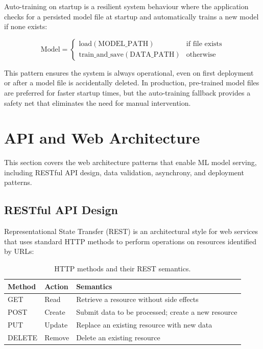 \documentclass[10pt,a4paper]{article}
\begin{document}
Auto-training on startup is a resilient system behaviour where the application checks for a persisted model file at startup and automatically trains a new model if none exists:

\begin{equation}
\text{Model} = \begin{cases} \text{load}(\text{MODEL\_PATH}) & \text{if file exists} \\ \text{train\_and\_save}(\text{DATA\_PATH}) & \text{otherwise} \end{cases}
\label{eq:auto-training}
\end{equation}

This pattern ensures the system is always operational, even on first deployment or after a model file is accidentally deleted. In production, pre-trained model files are preferred for faster startup times, but the auto-training fallback provides a safety net that eliminates the need for manual intervention.

\section{API and Web Architecture}
\label{sec:api-web}

This section covers the web architecture patterns that enable ML model serving, including RESTful API design, data validation, asynchrony, and deployment patterns.

\subsection{RESTful API Design}
\label{sec:rest-api}

Representational State Transfer (REST) is an architectural style for web services that uses standard HTTP methods to perform operations on resources identified by URLs:

\begin{table}[H]
\centering
\caption{HTTP methods and their REST semantics.}
\label{tab:http-methods}
\begin{tabular}{llp{6cm}}
\toprule
\textbf{Method} & \textbf{Action} & \textbf{Semantics} \\
\midrule
GET & Read & Retrieve a resource without side effects \\
POST & Create & Submit data to be processed; create a new resource \\
PUT & Update & Replace an existing resource with new data \\
DELETE & Remove & Delete an existing resource \\
\bottomrule
\end{tabular}
\end{table}
\end{document}

